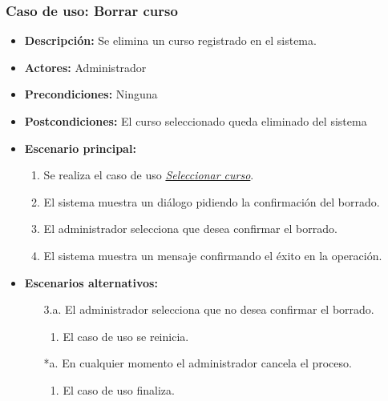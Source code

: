 \documentclass{book}
\begin{document}
\pagebreak

\subsubsection*{Caso de uso: Borrar curso}
\begin{itemize}
\item{\bf Descripción:} Se elimina un curso registrado en el sistema.
\item{\bf Actores:} Administrador
\item{\bf Precondiciones:} Ninguna
\item{\bf Postcondiciones:} El curso seleccionado queda eliminado del sistema
\item{\bf Escenario principal:}
	\begin{enumerate}
	\item Se realiza el caso de uso {\em \hyperref[select_curso]{Seleccionar curso}}.
	\item El sistema muestra un diálogo pidiendo la confirmación del borrado.
	\item El administrador selecciona que desea confirmar el borrado.
	\item El sistema muestra un mensaje confirmando el éxito en la operación.
	\end{enumerate}
\item{\bf Escenarios alternativos:}
	\begin{itemize}
		\item[3.a.] El administrador selecciona que no desea confirmar el borrado.
		\begin{enumerate}
			\item El caso de uso se reinicia.
		\end{enumerate}
		\item[*a.] En cualquier momento el administrador cancela el proceso.
		\begin{enumerate}
			\item El caso de uso finaliza.
		\end{enumerate}
	\end{itemize}
\end{itemize}
\end{document}
